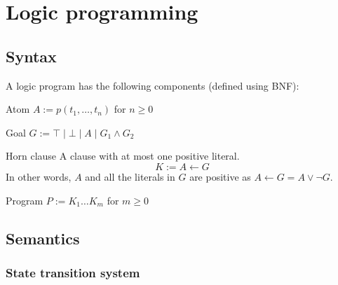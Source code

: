 \chapter{Logic programming}


\section{Syntax}

A logic program has the following components (defined using BNF):
\begin{descriptionlist}
    \item[Atom] 
        $A := p(t_1, \dots, t_n)$ for $n \geq 0$
    
    \item[Goal] 
        $G := \top \mid \bot \mid A \mid G_1 \land G_2$
    
    \item[Horn clause] 
        A clause with at most one positive literal.
        \[ K := A \leftarrow G \]
        In other words, $A$ and all the literals in $G$ are positive as $A \leftarrow G = A \vee \lnot G$.
    
    \item[Program] 
        $P := K_1 \dots K_m$ for $m \geq 0$
\end{descriptionlist}



\section{Semantics}

\subsection{State transition system}

